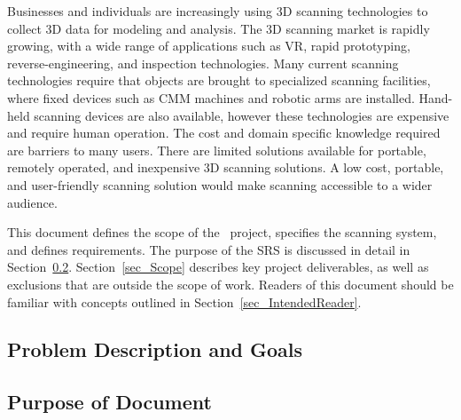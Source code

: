 \documentclass[12pt]{article}
\begin{document}

Businesses and individuals are increasingly using 3D scanning technologies to collect 3D data for modeling and analysis. The 3D scanning market is rapidly growing, with a wide range of applications such as VR, rapid prototyping, reverse-engineering, and inspection technologies. Many current scanning technologies require that objects are brought to specialized scanning facilities, where fixed devices such as CMM machines and robotic arms are installed. Hand-held scanning devices are also available,  however these technologies are expensive and require human operation. The cost and domain specific knowledge required are barriers to many users. There are limited solutions available for portable, remotely operated, and inexpensive 3D scanning solutions.  A low cost, portable, and user-friendly scanning solution would make scanning accessible to a wider audience.
\newline
\par
This document defines the scope of the \progname\ project, specifies the scanning system, and defines requirements. The purpose of the SRS is discussed in detail in Section~\ref{sec_purpose}.  Section~\ref{sec_Scope} describes key project deliverables, as well as exclusions that are outside the scope of work. Readers of this document should be familiar with concepts outlined in Section~\ref{sec_IntendedReader}.

\subsection{Problem Description and Goals}

\subsection{Purpose of Document}
\label{sec_purpose}

  
\end{document}
